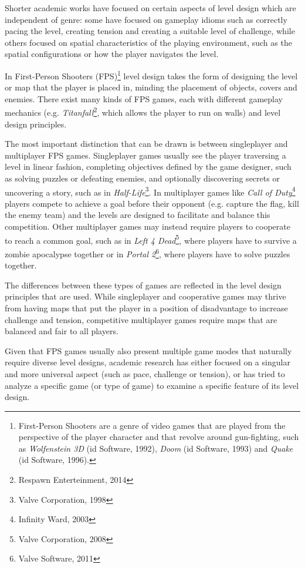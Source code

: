 \documentclass{Configuration_Files/PoliMi3i_thesis}
\begin{document}
Shorter academic works have focused on certain aspects of level design which are independent of genre: some have focused on gameplay idioms such as correctly pacing the level, creating tension and creating a suitable level of challenge, while others focused on spatial characteristics of the playing environment, such as the spatial configurations or how the player navigates the level. \cite{hullett_design_2010}

In First-Person Shooters (FPS)\footnote{First-Person Shooters are a genre of video games that are played from the perspective of the player character and that revolve around gun-fighting, such as \textit{Wolfenstein 3D} (id Software, 1992), \textit{Doom} (id Software, 1993) and \textit{Quake} (id Software, 1996).} level design takes the form of designing the level or map that the player is placed in, minding the placement of objects, covers and enemies. There exist many kinds of FPS games, each with different gameplay mechanics (e.g. \textit{Titanfall}\footnote{Respawn Enterteinment, 2014}, which allows the player to run on walls) and level design principles. 

The most important distinction that can be drawn is between singleplayer and multiplayer FPS games. Singleplayer games usually see the player traversing a level in linear fashion, completing objectives defined by the game designer, such as solving puzzles or defeating enemies, and optionally discovering secrets or uncovering a story, such as in \textit{Half-Life}\footnote{Valve Corporation, 1998}. In multiplayer games like \textit{Call of Duty}\footnote{Infinity Ward, 2003} players compete to achieve a goal before their opponent (e.g. capture the flag, kill the enemy team) and the levels are designed to facilitate and balance this competition. Other multiplayer games may instead require players to cooperate to reach a common goal, such as in \textit{Left 4 Dead}\footnote{Valve Corporation, 2008}, where players have to survive a zombie apocalypse together or in \textit{Portal 2}\footnote{Valve Software, 2011}, where players have to solve puzzles together.

The differences between these types of games are reflected in the level design principles that are used. While singleplayer and cooperative games may thrive from having maps that put the player in a position of disadvantage to increase challenge and tension, competitive multiplayer games require maps that are balanced and fair to all players. 

Given that FPS games usually also present multiple game modes that naturally require diverse level designs, academic research has either focused on a singular and more universal aspect (such as pace, challenge or tension), or has tried to analyze a specific game (or type of game) to examine a specific feature of its level design.
\end{document}
